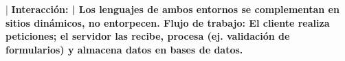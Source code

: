 
|
  \textbf{Interacción: |
  Los lenguajes de ambos entornos se complementan en sitios dinámicos, no entorpecen.
  \textbf{Flujo de trabajo:
} El cliente realiza peticiones; el servidor las recibe, procesa (ej. validación de formularios) y almacena datos en bases de datos.
}
